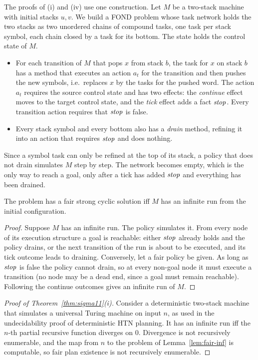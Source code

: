 The proofs of (i) and (iv) use one construction. Let $M$ be a two-stack machine with initial
stacks $u,v$. We build a FOND problem whose task network holds the two stacks as two unordered
chains of compound tasks, one task per stack symbol, each chain closed by a task for its bottom.
The state holds the control state of $M$.
\begin{itemize}
  \item For each transition of $M$ that pops $x$ from stack $b$, the task for $x$ on stack $b$ has a
    method that executes an action $a_t$ for the transition and then pushes the new symbols, i.e.\
    replaces $x$ by the tasks for the pushed word. The action $a_t$ requires the source control state
    and has two effects: the \emph{continue} effect moves to the target control state, and the
    \emph{tick} effect adds a fact $\mathit{stop}$. Every transition action requires that $\mathit{stop}$ is
    false.
  \item Every stack symbol and every bottom also has a \emph{drain} method, refining it into an
    action that requires $\mathit{stop}$ and does nothing.
\end{itemize}
Since a symbol task can only be refined at the top of its stack, a policy that does not drain
simulates $M$ step by step. The network becomes empty, which is the only way to reach a goal, only
after a tick has added $\mathit{stop}$ and everything has been drained.

\begin{lemma}\label{lem:fair-inf}
  The problem has a fair strong cyclic solution iff $M$ has an infinite run from the initial
  configuration.
\end{lemma}

\begin{proof}
  Suppose $M$ has an infinite run. The policy simulates it. From every node of its execution
  structure a goal is reachable: either $\mathit{stop}$ already holds and the policy drains, or the next
  transition of the run is about to be executed, and its tick outcome leads to draining. Conversely,
  let a fair policy be given. As long as $\mathit{stop}$ is false the policy cannot drain, so at every
  non-goal node it must execute a transition (no node may be a dead end, since a goal must remain
  reachable). Following the continue outcomes gives an infinite run of $M$.
\end{proof}

\begin{proof}[Proof of Theorem~\ref{thm:sigma11}(i)]
  Consider a deterministic two-stack machine that simulates a universal Turing machine on input
  $n$, as used in the undecidability proof of deterministic HTN planning. It has an infinite run iff
  the $n$-th partial recursive function diverges on $0$. Divergence is not recursively enumerable,
  and the map from $n$ to the problem of Lemma~\ref{lem:fair-inf} is computable, so fair plan
  existence is not recursively enumerable.
\end{proof}

